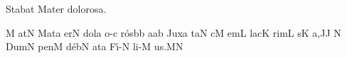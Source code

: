 \beginhymn Stabat Mater dolorosa.


\Internote
\initiumgregorianum
{}%
\punctum M\egn
\sgn {}at\punctum N\egn
\spatium
\sgn M{a}t\punctum a\egn
\sgn {}er\punctum N\egn
\spatium
\sgn dol\punctum a\egn
\sgn {}o-\punctum c\egn
\sgn r{\'o}s\bmolle b\punctum b\egn
\sgn {}a{}\punctum a\augmentum b\egn
\spatium
\divisiominor
\spatium
\sgn Jux\punctum a\egn
\sgn ta{}\punctum N\egn
\spatium
{}c\punctum M\egn
\sgn {}em\punctum L\egn
\spatium
\sgn lac\punctum K\egn
\sgn rim\punctum L\egn
{}s\punctum K\egn
\sgn {}a,\punctum J\augmentum J\egn
\spatium
\divisiominor
\custos N
\lineaproxima
\sgn Dum\punctum N\egn
\spatium
\sgn pen\punctum M\egn
\sgn d{\'e}b\punctum N\egn
\sgn {}at\punctum a\egn
\spatium
\sgn F{\'\i}-\punctum N\egn
\sgn li-\punctum M\egn
\sgn {}u{s.}\punctum M\augmentum N\egn
\spatium
\Finisgregoriana

\bigskip

\beginlyrics

